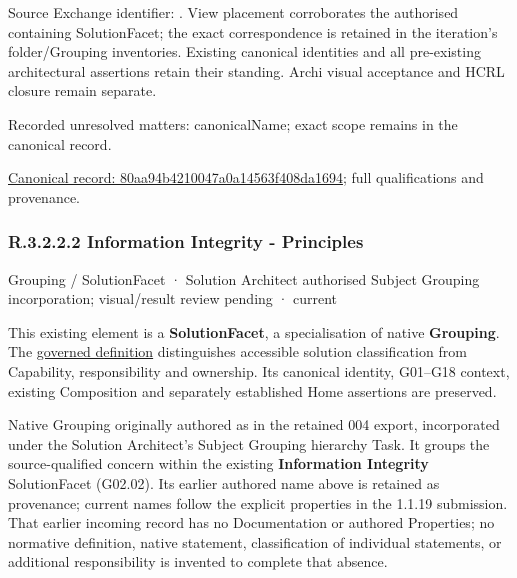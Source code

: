 Source Exchange identifier: \texttt{}. View placement corroborates
the authorised containing SolutionFacet; the exact correspondence is retained in the
iteration's folder/Grouping inventories. Existing canonical identities and all
pre-existing architectural assertions retain their standing. Archi visual
acceptance and HCRL closure remain separate.


{\small Recorded unresolved matters: canonicalName; exact scope remains in the canonical record.}\par
{\footnotesize \href{../../../../../../../continuum/grouping/80aa94b4210047a0a14563f408da1694.md}{Canonical record: 80aa94b4210047a0a14563f408da1694}; full qualifications and provenance.}\par
\subsubsection*{R.3.2.2.2 Information Integrity - Principles}
\label{navigation:R.3.2.2.2}

\label{element:88d1c3fd640448c2b35933d2b03b8151}
{\small Grouping / SolutionFacet · Solution Architect authorised Subject Grouping incorporation; visual/result review pending · current}\par

This existing element is a \textbf{SolutionFacet}, a specialisation of native
\textbf{Grouping}. The \href{\detokenize{../../../../../../../governance/continuum-representation.md#solutionfacet-classification--1119-candidate}}{governed definition}
distinguishes accessible solution classification from Capability, responsibility
and ownership. Its canonical identity, G01–G18 context, existing Composition
and separately established Home assertions are preserved.



Native Grouping originally authored as \texttt{} in the retained 004 export,
incorporated under the Solution Architect's Subject Grouping hierarchy Task.
It groups the source-qualified \texttt{} concern within
the existing \textbf{Information Integrity} SolutionFacet (G02.02). Its earlier authored name above is retained as provenance; current names
follow the explicit properties in the 1.1.19 submission.
That earlier incoming record has no Documentation or authored Properties; no normative
definition, native statement, classification of individual statements, or
additional responsibility is invented to complete that absence.



